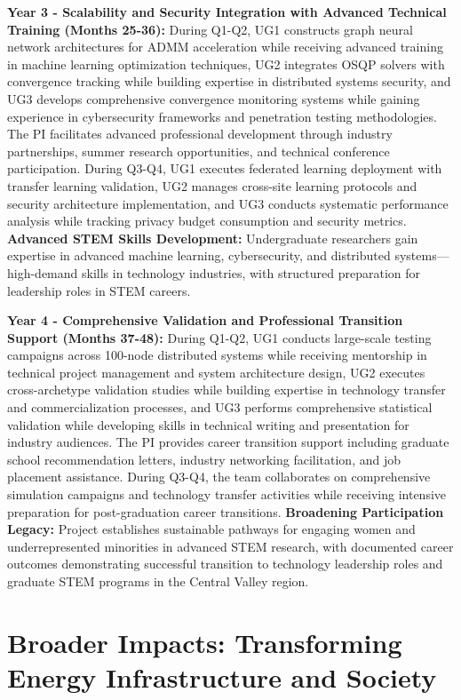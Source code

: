 \documentclass[12pt]{article}
\begin{document}
\textbf{Year 3 - Scalability and Security Integration with Advanced Technical Training (Months 25-36):} During Q1-Q2, UG1 constructs graph neural network architectures for ADMM acceleration while receiving advanced training in machine learning optimization techniques, UG2 integrates OSQP solvers with convergence tracking while building expertise in distributed systems security, and UG3 develops comprehensive convergence monitoring systems while gaining experience in cybersecurity frameworks and penetration testing methodologies. The PI facilitates advanced professional development through industry partnerships, summer research opportunities, and technical conference participation. During Q3-Q4, UG1 executes federated learning deployment with transfer learning validation, UG2 manages cross-site learning protocols and security architecture implementation, and UG3 conducts systematic performance analysis while tracking privacy budget consumption and security metrics. \textbf{Advanced STEM Skills Development:} Undergraduate researchers gain expertise in advanced machine learning, cybersecurity, and distributed systems—high-demand skills in technology industries, with structured preparation for leadership roles in STEM careers.

\textbf{Year 4 - Comprehensive Validation and Professional Transition Support (Months 37-48):} During Q1-Q2, UG1 conducts large-scale testing campaigns across 100-node distributed systems while receiving mentorship in technical project management and system architecture design, UG2 executes cross-archetype validation studies while building expertise in technology transfer and commercialization processes, and UG3 performs comprehensive statistical validation while developing skills in technical writing and presentation for industry audiences. The PI provides career transition support including graduate school recommendation letters, industry networking facilitation, and job placement assistance. During Q3-Q4, the team collaborates on comprehensive simulation campaigns and technology transfer activities while receiving intensive preparation for post-graduation career transitions. \textbf{Broadening Participation Legacy:} Project establishes sustainable pathways for engaging women and underrepresented minorities in advanced STEM research, with documented career outcomes demonstrating successful transition to technology leadership roles and graduate STEM programs in the Central Valley region.



\section{Broader Impacts: Transforming Energy Infrastructure and Society}
\end{document}
